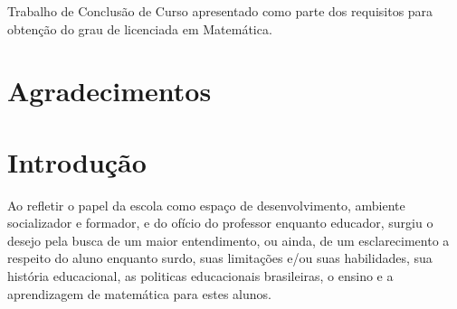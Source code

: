 \documentclass[brasil]{abnt}
\begin{document}

\capa
\folhaderosto

\begin{folhadeaprovacao}
    Trabalho de Conclusão de Curso apresentado como parte dos requisitos para obtenção do grau de licenciada em Matemática.

\setlength{\ABNTsignthickness}{0.4pt}


\end{folhadeaprovacao}

\tableofcontents

\chapter*{Agradecimentos}


\begin{resumo}

\end{resumo}

\chapter*{Introdução}
	
	Ao refletir o papel da escola como  espaço de desenvolvimento, ambiente socializador e formador, e do ofício do professor enquanto educador, surgiu o desejo pela busca 
	de um maior entendimento, ou ainda, de um esclarecimento a respeito do aluno enquanto surdo, suas limitações e/ou suas habilidades, sua história educacional, as politicas 
	educacionais brasileiras, o ensino e a aprendizagem de matemática para estes alunos.  
		
\end{document}
